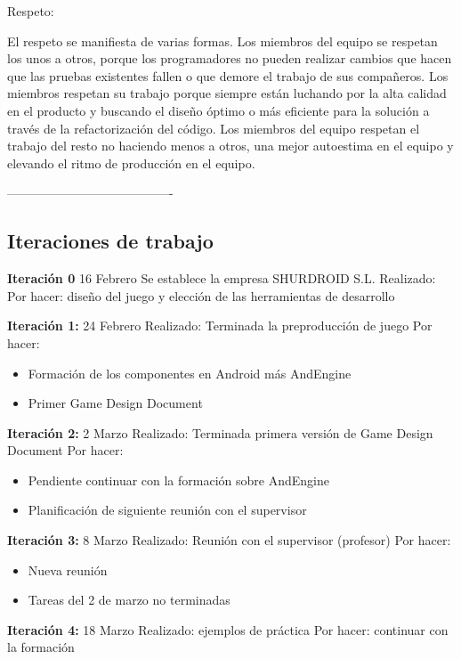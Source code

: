 \documentclass[12 pt, a4paper, twoside]{article}
\begin{document}
    Respeto:

El respeto se manifiesta de varias formas. Los miembros del equipo se respetan los unos a otros, porque los programadores no pueden realizar cambios que hacen que las pruebas existentes fallen o que demore el trabajo de sus compañeros. Los miembros respetan su trabajo porque siempre están luchando por la alta calidad en el producto y buscando el diseño óptimo o más eficiente para la solución a través de la refactorización del código. Los miembros del equipo respetan el trabajo del resto no haciendo menos a otros, una mejor autoestima en el equipo y elevando el ritmo de producción en el equipo.

----------------------------------------



\subsection{Iteraciones de trabajo}
\textbf{Iteración 0}
16 Febrero Se establece la empresa SHURDROID S.L.
Realizado:
Por hacer: diseño del juego y elección de las herramientas de
desarrollo

\textbf{Iteración 1:}
24 Febrero
Realizado: Terminada la preproducción de juego
Por hacer:
\begin{itemize}
\item Formación de los componentes en Android más AndEngine
\item Primer Game Design Document
\end{itemize}

\textbf{Iteración 2:}
2 Marzo
Realizado: Terminada primera versión de Game Design Document
Por hacer:
\begin{itemize}
\item Pendiente continuar con la formación sobre AndEngine
\item Planificación de siguiente reunión con el supervisor
\end{itemize}

\textbf{Iteración 3:}
8 Marzo
Realizado: Reunión con el supervisor (profesor)
Por hacer:
\begin{itemize}
\item Nueva reunión
\item Tareas del 2 de marzo no terminadas
\end{itemize}

\textbf{Iteración 4:}
18 Marzo
Realizado: ejemplos de práctica
Por hacer: continuar con la formación
\end{document}
